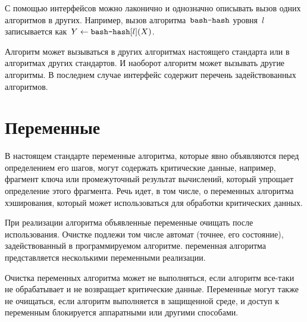 С помощью интерфейсов можно лаконично и однозначно 
описывать вызов одних алгоритмов в других.
%        	
Например, вызов алгоритма~$\texttt{bash-hash}$ уровня~$l$
записывается как~$Y\leftarrow\texttt{bash-hash}[l](X)$.

Алгоритм может вызываться в других алгоритмах настоящего стандарта или 
в алгоритмах других стандартов. И наоборот\addendum{,} алгоритм может вызывать другие 
алгоритмы. В последнем случае интерфейс содержит перечень задействованных 
алгоритмов.

\section{Переменные}\label{COMMON.Vars}

В настоящем стандарте переменные алгоритма, которые явно объявляются перед 
определением его шагов, могут содержать критические данные, например, фрагмент 
ключа или промежуточный результат вычислений, который упрощает определение 
этого фрагмента.
%
Речь идет, в том числе, о переменных алгоритма хэширования, 
который может использоваться для обработки критических данных.

При реализации алгоритма объявленные переменные  очищать после
использования. 
%
Очистке подлежи том числе автомат (точнее, его состояние),
задействованный в программируемом алгоритме.
%
 переменная алгоритма представляется
несколькими переменными реализации.

Очистка переменных алгоритма может не выполняться, если алгоритм все-таки 
не обрабатывает и не возвращает критические данные.
%
Переменные могут также не очищаться, если алгоритм выполняется в защищенной 
среде, и доступ к переменным блокируется аппаратными или другими способами.


